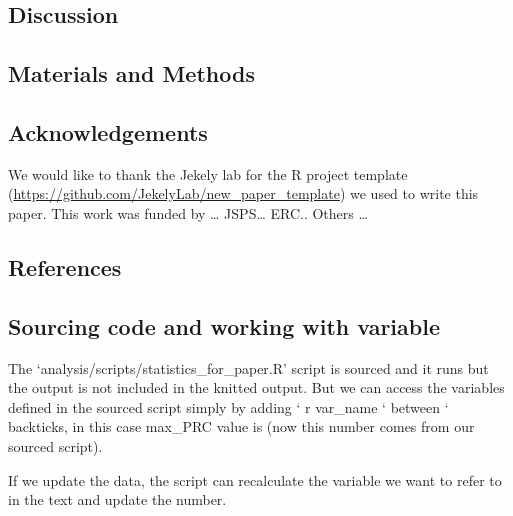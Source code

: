 \documentclass[
  11pt,
]{article}
\begin{document}
\subsection{Discussion}\label{discussion}

\subsection{Materials and Methods}\label{materials-and-methods}

\subsection{Acknowledgements}\label{acknowledgements}

We would like to thank the Jekely lab for the R project template
(\url{https://github.com/JekelyLab/new_paper_template}) we used to write
this paper. This work was funded by \ldots{} JSPS\ldots{} ERC.. Others
\ldots{}

\subsection{References}\label{references}

\subsection{Sourcing code and working with
variable}\label{sourcing-code-and-working-with-variable}

The `analysis/scripts/statistics\_for\_paper.R' script is sourced and it
runs but the output is not included in the knitted output. But we can
access the variables defined in the sourced script simply by adding ` r
var\_name ` between ` backticks, in this case max\_PRC value is (now
this number comes from our sourced script).

If we update the data, the script can recalculate the variable we want
to refer to in the text and update the number.
\end{document}
